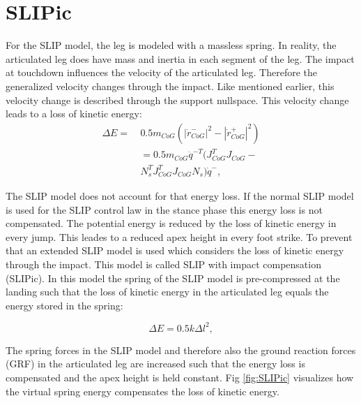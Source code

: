 \documentclass[10pt,conference]{IEEEtran}
\begin{document}
\section{SLIPic}
\label{sec:SLIPic}
For the SLIP model, the leg is modeled with a massless spring. In reality, the articulated leg does have mass and inertia in each segment of the leg. 
The impact at touchdown influences the velocity of the articulated leg. Therefore the generalized velocity changes through the impact. 
Like mentioned earlier, this velocity change is described through the support nullspace. This velocity change leads to a loss of kinetic energy:
\begin{equation}
\begin{aligned}
   \Delta E = & \ 0.5 {m}_{CoG} ({|{\dot{r}}_{CoG}^{-}|}^{2} - {|{\dot{r}}_{CoG}^{+}|}^{2}) \\
   & \ =0.5 {m}_{CoG} {\dot{q}}^{-T} ({J}_{CoG}^{T} {J}_{CoG} - \\
   & \ {N}_{s}^{T} {J}_{CoG}^{T} {J}_{CoG} {N}_{s}) {\dot{q}}^{-},
\end{aligned}
\end{equation}

The SLIP model does not account for that energy loss. If the normal SLIP model is used for the SLIP 
control law in the stance phase this energy loss is not compensated. The potential energy is reduced by the loss of kinetic energy in every jump. This leades to a reduced apex height 
in every foot strike. To prevent that an extended SLIP model is used which considers the loss of kinetic energy through the impact. This model is called SLIP with impact compensation 
(SLIPic). In this model the spring of the SLIP model is pre-compressed at the landing such that the loss of kinetic energy in the articulated leg equals the energy stored in the spring: 

\begin{equation}
   \Delta E = 0.5 k {\Delta l}^{2},
\end{equation}

The spring forces in the SLIP model and therefore also the ground reaction forces (GRF) in the articulated leg are increased such that the energy loss is compensated and the apex height is 
held constant. Fig \ref{fig:SLIPic} visualizes how the virtual spring energy compensates the loss of kinetic energy.
\end{document}
